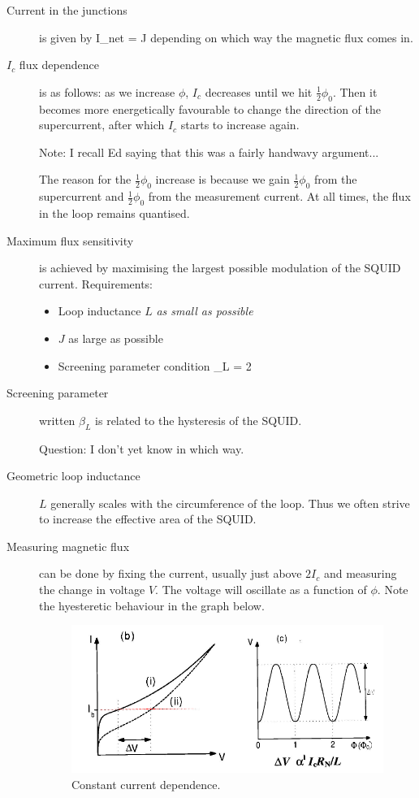 \begin{description}
\item[Current in the junctions] is given by 
\beq
I_{net} =  \pm J
\eeq
depending on which way the magnetic flux comes in. 

\item[$I_c$ flux dependence] is as follows:  as we increase $\phi$, $I_c$ decreases until we hit $\frac{1}{2} \phi_0$. Then it becomes more energetically favourable to change the direction of the supercurrent, after which $I_c$ starts to increase again. 

Note: I recall Ed saying that this was a fairly handwavy argument... 

The reason for the $\frac{1}{2} \phi_0$ increase is because we gain $\frac{1}{2} \phi_0$ from the supercurrent and $\frac{1}{2} \phi_0$ from the measurement current. At all times, the flux in the loop remains quantised. 

\item[Maximum flux sensitivity] is achieved by maximising the largest possible modulation of the SQUID current. Requirements:
\begin{itemize}
\item Loop inductance $L$ \emph{as small as possible}
\item $J$ as large as possible
\item Screening parameter condition
\beq
\beta_L  = 2  
\eeq
\end{itemize}


\item[Screening parameter] written $\beta_L$ is related to the hysteresis of the SQUID. 

Question: I don't yet know in which way. 

\item[Geometric loop inductance] $L$ generally scales with the circumference of the loop. Thus we often strive to increase the effective area of the SQUID. 


\item[Measuring magnetic flux] can be done by fixing the current, usually just above $2I_c$ and measuring the change in voltage $V$. The voltage will oscillate as a function of $\phi$. Note the hyesteretic behaviour in the graph below. 

\begin{figure}[h]
  \caption{Constant current dependence.}
  \centering
    \includegraphics[width=\textwidth]{./SC_figures/Constant_Current_Measurement.PNG}
\end{figure}


\end{description}
